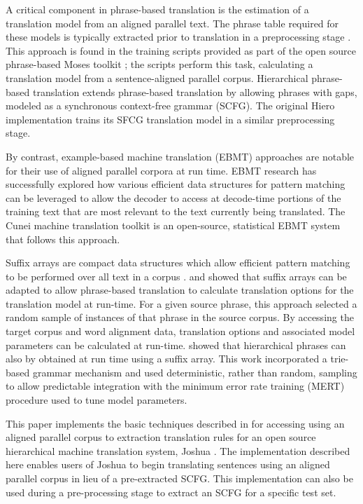 \documentclass{pbml}
\newcommand{\newcite}{\namecite}
\begin{document}
A critical component in phrase-based translation is the estimation of a translation model from an aligned parallel text. The phrase table required for these models is typically extracted prior to translation in a preprocessing stage \cite{Koehn2003,Kumar2006}. This approach is found in the training scripts provided as part of the open source phrase-based Moses toolkit \cite{Moses}; the scripts perform this task, calculating a translation model from a sentence-aligned parallel corpus. Hierarchical phrase-based translation \cite{Chiang2005} extends phrase-based translation by allowing phrases with gaps, modeled as a synchronous context-free grammar (SCFG). The original Hiero implementation \cite{Chiang2007} trains its SFCG translation model in a similar preprocessing stage.

By contrast, example-based machine translation (EBMT) approaches \cite{Nagao1981,Sato1990,Somers2003} are notable for their use of aligned parallel corpora at run time. EBMT research has successfully explored how various efficient data structures for pattern matching can be leveraged to allow the decoder to access at decode-time portions of the training text that are most relevant to the text currently being translated. The Cunei machine translation toolkit \cite{Phillips2009} is an open-source, statistical EBMT system that follows this approach.
 
Suffix arrays are compact data structures which allow efficient pattern matching to be performed over all text in a corpus \cite{Manber1990}.  \newcite{Callison-Burch2005b} and \newcite{Zhang2005} showed that suffix arrays can be adapted to allow phrase-based translation to calculate translation options for the translation model at run-time. For a given source phrase, this approach selected a random sample of instances of that phrase in the source corpus. By accessing the target corpus and word alignment data, translation options and associated model parameters can be calculated at run-time. \newcite{Lopez2007} showed that hierarchical phrases can also by obtained at run time using a suffix array. This work incorporated a trie-based grammar mechanism \cite{Fredkin1960} and used deterministic, rather than random, sampling to allow predictable integration with the minimum error rate training (MERT) procedure \cite{Och2003c} used to tune model parameters.

This paper implements the basic techniques described in \newcite{Lopez2008} for accessing using an aligned parallel corpus to extraction translation rules for an open source hierarchical machine translation system, Joshua \cite{Joshua-WMT}. The implementation described here enables users of Joshua to begin translating sentences using an aligned parallel corpus in lieu of a pre-extracted SCFG. This implementation can also be used during a pre-processing stage to extract an SCFG for a specific test set.
\end{document}
